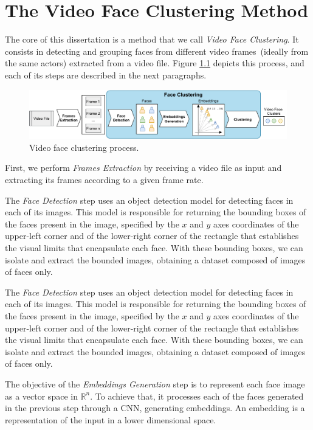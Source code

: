 \chapter{The Video Face Clustering Method}
\label{chap:video_face_clustering}

The core of this dissertation is a method that we call \emph{Video Face Clustering}.
It consists in detecting and grouping faces from different video frames~(ideally from the same actors) extracted from a video file.
Figure \ref{fig:video_face_clustering} depicts this process, and each of its steps are described in the next paragraphs.

\begin{figure}[!ht]
    \centering
    \includegraphics[width=\textwidth]{img/face_clustering/video_face_clustering.pdf}
    \caption{Video face clustering process.}
    \label{fig:video_face_clustering}
\end{figure}


First, we perform \textit{Frames Extraction} by receiving a video file as input and extracting its frames according to a given frame rate. 

The \textit{Face Detection} step uses an object detection model for detecting faces in each of its images.
This model is responsible for returning the bounding boxes of the faces present in the image, specified by the $x$ and $y$ axes coordinates of the upper-left corner and of the lower-right corner of the rectangle that establishes the visual limits that encapsulate each face. 
With these bounding boxes, we can isolate and extract the bounded images, obtaining a dataset composed of images of faces only.

The \textit{Face Detection} step uses an object detection model for detecting faces in each of its images.
This model is responsible for returning the bounding boxes of the faces present in the image, specified by the $x$ and $y$ axes coordinates of the upper-left corner and of the lower-right corner of the rectangle that establishes the visual limits that encapsulate each face. 
With these bounding boxes, we can isolate and extract the bounded images, obtaining a dataset composed of images of faces only.


The objective of the \textit{Embeddings Generation} step is to represent each face image as a vector space in $\mathbb{R}^{n}$.
To achieve that, it processes each of the faces generated in the previous step through a CNN, generating embeddings. 
An embedding is a representation of the input in a lower dimensional space.

